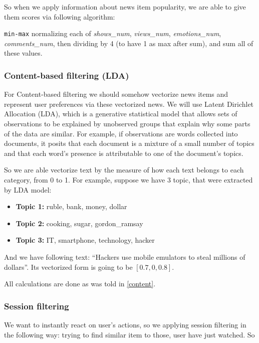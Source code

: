 \documentclass{article}
\begin{document}
So when we apply information about news item popularity, we are able to give them scores via following algorithm:

\texttt{min-max} normalizing each of \emph{shows\_num}, \emph{views\_num}, \emph{emotions\_num}, \emph{comments\_num}, then dividing by 4 (to have 1 as max after sum), and sum all of these values.


\subsubsection{Content-based filtering (LDA)}

For Content-based filtering we should somehow vectorize news items and represent user preferences via these vectorized news. We will use Latent Dirichlet Allocation (LDA), which is a generative statistical model that allows sets of observations to be explained by unobserved groups that explain why some parts of the data are similar. For example, if observations are words collected into documents, it posits that each document is a mixture of a small number of topics and that each word's presence is attributable to one of the document's topics.

So we are able vectorize text by the measure of how each text belongs to each category, from 0 to 1.
For example, suppose we have 3 topic, that were extracted by LDA model:

\begin{itemize}
    \item \textbf{Topic 1:} ruble, bank, money, dollar
    \item \textbf{Topic 2:} cooking, sugar, gordon\_ramsay
    \item \textbf{Topic 3:} IT, smartphone, technology, hacker
\end{itemize}

And we have following text: ``Hackers use mobile emulators to steal millions of dollars''. Its vectorized form is going to be $[0.7, 0, 0.8]$.

All calculations are done as was told in \ref{content}.


\subsubsection{Session filtering}

We want to instantly react on user's actions, so we applying session filtering in the following way:
trying to find similar item to those, user have just watched. So 
\end{document}
